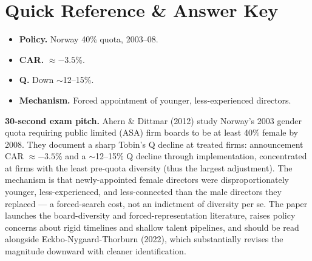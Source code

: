\documentclass[11pt]{article}
\begin{document}
\section*{Quick Reference \& Answer Key}
\begin{answerbox}
\begin{itemize}
\item \textbf{Policy.} Norway 40\% quota, 2003--08.
\item \textbf{CAR.} $\approx -3.5$\%.
\item \textbf{Q.} Down $\sim$12--15\%.
\item \textbf{Mechanism.} Forced appointment of younger, less-experienced directors.
\end{itemize}
\end{answerbox}

\begin{keybox}
\textbf{30-second exam pitch.} Ahern \& Dittmar (2012) study Norway's 2003 gender quota requiring public limited (ASA) firm boards to be at least 40\% female by 2008. They document a sharp Tobin's Q decline at treated firms: announcement CAR $\approx -3.5$\% and a $\sim$12--15\% Q decline through implementation, concentrated at firms with the least pre-quota diversity (thus the largest adjustment). The mechanism is that newly-appointed female directors were disproportionately younger, less-experienced, and less-connected than the male directors they replaced --- a forced-search cost, not an indictment of diversity per se. The paper launches the board-diversity and forced-representation literature, raises policy concerns about rigid timelines and shallow talent pipelines, and should be read alongside Eckbo-Nygaard-Thorburn (2022), which substantially revises the magnitude downward with cleaner identification.
\end{keybox}
\end{document}
